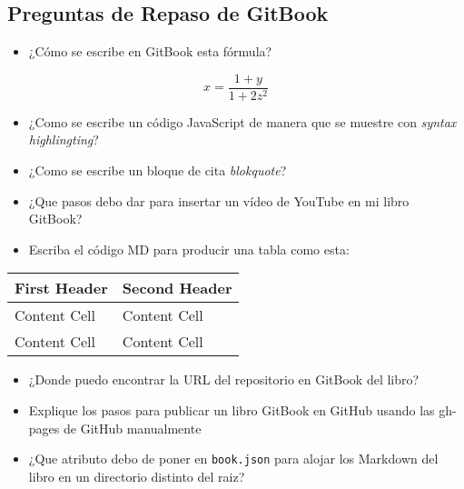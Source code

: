 \subsection{Preguntas de Repaso de
GitBook}\label{preguntas-de-repaso-de-gitbook}

\begin{itemize}
\itemsep1pt\parskip0pt
\item
  ¿Cómo se escribe en GitBook esta fórmula?
\end{itemize}

\[x=\frac{1+y}{1+2z^2}\]

\begin{itemize}
\itemsep1pt\parskip0pt
\item
  ¿Como se escribe un código JavaScript de manera que se muestre con
  \emph{syntax highlingting}?
\item
  ¿Como se escribe un bloque de cita \emph{blokquote}?
\item
  ¿Que pasos debo dar para insertar un vídeo de YouTube en mi libro
  GitBook?
\item
  Escriba el código MD para producir una tabla como esta:
\end{itemize}

\begin{longtable}[c]{@{}ll@{}}
\toprule
First Header & Second Header\tabularnewline
\midrule
\endhead
Content Cell & Content Cell\tabularnewline
Content Cell & Content Cell\tabularnewline
\bottomrule
\end{longtable}

\begin{itemize}
\itemsep1pt\parskip0pt
\item
  ¿Donde puedo encontrar la URL del repositorio en GitBook del libro?
\item
  Explique los pasos para publicar un libro GitBook en GitHub usando las
  gh-pages de GitHub manualmente
\item
  ¿Que atributo debo de poner en \texttt{book.json} para alojar los
  Markdown del libro en un directorio distinto del raiz?
\end{itemize}

